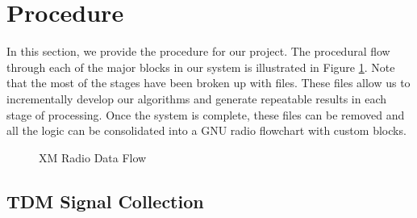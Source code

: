 \documentclass[conference,onecolumn]{IEEEtran}
\begin{document}
\section{Procedure}

In this section, we provide the procedure for our project. The procedural flow through each of the major blocks in our system is illustrated in Figure \ref{fig::xm_radio_processing}. Note that the most of the stages have been broken up with files. These files allow us to incrementally develop our algorithms and generate repeatable results in each stage of processing. Once the system is complete, these files can be removed and all the logic can be consolidated into a GNU radio flowchart with custom blocks.

\begin{figure}[H]
	\centerline{}
	\caption{XM Radio Data Flow}
	\label{fig::xm_radio_processing}
\end{figure}

\subsection{TDM Signal Collection}
\end{document}
